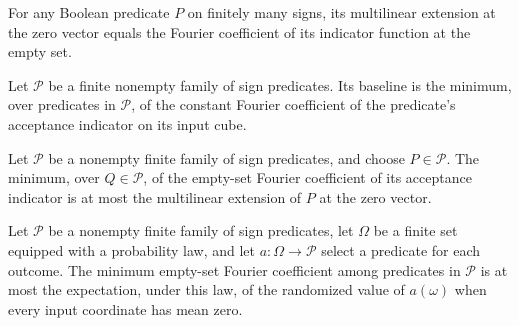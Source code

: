 \begin{theorem}
\label{FABL.SignPredicate.multilinearExtension_zero}
\leanok
{}
For any Boolean predicate $P$ on finitely many signs, its multilinear extension at the
zero vector equals the Fourier coefficient of its indicator function at the empty set.
\end{theorem}

\begin{definition}
\label{FABL.predicateFamilyBaseline}
\leanok
{}
Let $\mathcal{P}$ be a finite nonempty family of sign predicates. Its baseline is the
minimum, over predicates in $\mathcal{P}$, of the constant Fourier coefficient of the
predicate's acceptance indicator on its input cube.
\end{definition}

\begin{theorem}
\label{FABL.predicateFamilyBaseline_le_multilinearExtension_zero}
\leanok
{}
Let $\mathcal P$ be a nonempty finite family of sign predicates, and choose
$P\in\mathcal P$. The minimum, over $Q\in\mathcal P$, of the empty-set Fourier
coefficient of its acceptance indicator is at most the multilinear extension of $P$ at
the zero vector.
\end{theorem}

\begin{theorem}
\label{FABL.predicateFamilyBaseline_le_zeroAssignmentExpectation}
\leanok
{}
Let $\mathcal P$ be a nonempty finite family of sign predicates, let $\Omega$ be a
finite set equipped with a probability law, and let $a:\Omega\to\mathcal P$ select a
predicate for each outcome. The minimum empty-set Fourier coefficient among predicates
in $\mathcal P$ is at most the expectation, under this law, of the randomized value of
$a(\omega)$ when every input coordinate has mean zero.
\end{theorem}

